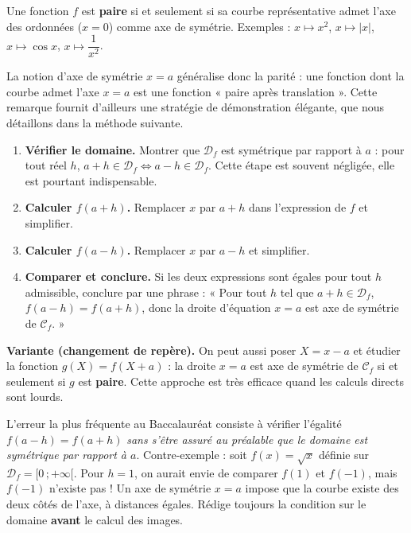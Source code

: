 \documentclass[11pt]{article}
\newcounter{popsec}
\newcounter{popsub}
\newcommand{\courssub}[1]{%
  \stepcounter{popsub}%
  \par\vspace{9pt}\noindent{\popxbold\fontsize{11.5}{13}\selectfont\color{popink}{\color{poporange}\thepopsec.\thepopsub}\hspace{6pt}#1}\par\nopagebreak\vspace{4pt}
}
\begin{document}
\begin{aretenir}
Une fonction $f$ est \textbf{paire} si et seulement si sa courbe représentative admet l'axe des ordonnées ($x = 0$) comme axe de symétrie. Exemples : $x \mapsto x^2$, $x \mapsto |x|$, $x \mapsto \cos x$, $x \mapsto \dfrac{1}{x^2}$.
\end{aretenir}

La notion d'axe de symétrie $x = a$ généralise donc la parité : une fonction dont la courbe admet l'axe $x = a$ est une fonction « paire après translation ». Cette remarque fournit d'ailleurs une stratégie de démonstration élégante, que nous détaillons dans la méthode suivante.

\courssub{Méthode de démonstration}

\begin{methode}[Prouver que la droite $x = a$ est axe de symétrie de $\mathcal{C}_f$]
\begin{enumerate}
\item \textbf{Vérifier le domaine.} Montrer que $\mathcal{D}_f$ est symétrique par rapport à $a$ : pour tout réel $h$, $a + h \in \mathcal{D}_f \iff a - h \in \mathcal{D}_f$. Cette étape est souvent négligée, elle est pourtant indispensable.
\item \textbf{Calculer $f(a + h)$.} Remplacer $x$ par $a + h$ dans l'expression de $f$ et simplifier.
\item \textbf{Calculer $f(a - h)$.} Remplacer $x$ par $a - h$ et simplifier.
\item \textbf{Comparer et conclure.} Si les deux expressions sont égales pour tout $h$ admissible, conclure par une phrase : « Pour tout $h$ tel que $a + h \in \mathcal{D}_f$, $f(a - h) = f(a + h)$, donc la droite d'équation $x = a$ est axe de symétrie de $\mathcal{C}_f$. »
\end{enumerate}
\textbf{Variante (changement de repère).} On peut aussi poser $X = x - a$ et étudier la fonction $g(X) = f(X + a)$ : la droite $x = a$ est axe de symétrie de $\mathcal{C}_f$ si et seulement si $g$ est \textbf{paire}. Cette approche est très efficace quand les calculs directs sont lourds.
\end{methode}

\begin{attention}
L'erreur la plus fréquente au Baccalauréat consiste à vérifier l'égalité $f(a - h) = f(a + h)$ \emph{sans s'être assuré au préalable que le domaine est symétrique par rapport à $a$}. Contre-exemple : soit $f(x) = \sqrt{x}$ définie sur $\mathcal{D}_f = [0\,; +\infty[$. Pour $h = 1$, on aurait envie de comparer $f(1)$ et $f(-1)$, mais $f(-1)$ n'existe pas ! Un axe de symétrie $x = a$ impose que la courbe existe des deux côtés de l'axe, à distances égales. Rédige toujours la condition sur le domaine \textbf{avant} le calcul des images.
\end{attention}
\end{document}

